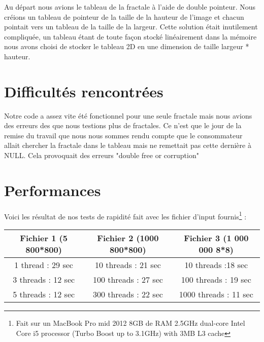 \documentclass[10pt,a4paper]{article}
\begin{document}
Au départ nous avions le tableau de la fractale à l'aide de double pointeur.
Nous créions un tableau de pointeur de la taille de la hauteur de l'image et chacun pointait vers un tableau de la taille de la largeur.
Cette solution était inutilement compliquée, un tableau étant de toute façon stocké linéairement dans la mémoire nous avons choisi de stocker le tableau 2D en une dimension de taille largeur * hauteur.

\section{Difficultés rencontrées}

Notre code a assez vite été fonctionnel pour une seule fractale mais nous avions des erreurs des que nous testions plus de fractales. Ce n'est que le jour de la remise du travail que nous nous sommes rendu compte que le consommateur allait chercher la fractale dans le tableau mais ne remettait pas cette dernière à NULL. Cela provoquait des erreurs "double free or corruption" 

\section{Performances}


Voici les résultat de nos tests de rapidité fait avec les fichier d'input fournis\footnote{Fait sur un MacBook Pro mid 2012 8GB de RAM 2.5GHz dual-core Intel Core i5 processor (Turbo Boost up to 3.1GHz) with 3MB L3 cache} : 

\begin{tabular}{|c|c|c|}
 \hline 
 Fichier 1 (5 800*800) & Fichier 2 (1000 800*800) & Fichier 3 (1 000 000 8*8) \\ 
 \hline 
 1 thread : 29 sec & 10 threads : 21 sec & 10 threads :18 sec \\ 
 \hline 
 3 threads : 12 sec & 100 threads : 27 sec & 100 threads : 19 sec\\ 
 \hline 
 5 threads : 12 sec  &  300 threads : 22 sec & 1000 threads : 11 sec\\ 
 \hline
 \end{tabular}  
\end{document}
